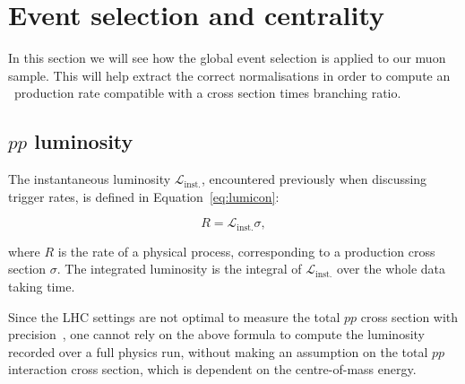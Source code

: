 


\vspace{0.5em}
\begin{center}
\end{center}

\clearpage
\section{Event selection and centrality}
\label{sec:evtsel}
In this section we will see how the global event selection is applied
to our muon sample. This will help extract the correct normalisations
in order to compute an \PgU\ production rate compatible with a cross
section times branching ratio.
\subsection{\texorpdfstring{$pp$}{pp} luminosity}
\label{sec:pplumi}
The instantaneous luminosity $\mathcal{L}_{\textrm{inst.}}$, encountered previously when discussing
trigger rates, is defined in Equation~\ref{eq:lumicon}:

\begin{equation}
 R = \mathcal{L}_{\textrm{inst.}}\sigma,
\label{eq:lumicon}
\end{equation}

where $R$ is the rate of a physical process, corresponding to a
production cross section $\sigma$. The integrated luminosity is the
integral of $\mathcal{L}_{\textrm{inst.}}$ over the whole data taking
time.


Since the LHC settings are not optimal to measure the total $pp$ cross
section with precision~\cite{Bayatian:2006zz}, one cannot rely on the
above formula to compute the luminosity recorded over a full physics
run, without making an assumption on the total $pp$ interaction cross
section, which is dependent on the centre-of-mass energy.

